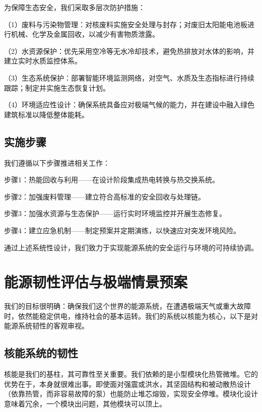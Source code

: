 为保障生态安全，我们采取多层次防护措施：

（1）废料与污染物管理：对核废料实施安全处理与封存；对废旧太阳能电池板进行机械、化学及金属回收，以减少有害物质泄露。

（2）水资源保护：优先采用空冷等无水冷却技术，避免热排放对水体的影响，并建立实时水质监控体系。

（3）生态系统保护：部署智能环境监测网络，对空气、水质及生态指标进行持续跟踪；制定并实施生态恢复计划。

（4）环境适应性设计：确保系统具备应对极端气候的能力，并在建设中融入绿色建筑标准以降低整体能耗。

\subsection{实施步骤}\label{ux5b9eux65bdux6b65ux9aa4}

我们遵循以下步骤推进相关工作：

步骤1：热能回收与利用------在设计阶段集成热电转换与热交换系统。

步骤2：加强废料管理------建立符合高标准的安全回收与处理链。

步骤3：加强水资源与生态保护------运行实时环境监控并开展生态修复。

步骤4：建立应急机制------制定预案并定期演练，以快速应对突发环境风险。

通过上述系统性设计，我们致力于实现能源系统的安全运行与环境的可持续协调。

\section{能源韧性评估与极端情景预案}\label{ux80fdux6e90ux97e7ux6027ux8bc4ux4f30ux4e0eux6781ux7aefux60c5ux666fux9884ux6848}

我们的目标很明确：确保我们这个世界的能源系统，在遭遇极端天气或重大故障时，依然能稳定供电，维持社会的基本运转。我们的系统以核能为核心，以下是对能源系统韧性的客观审视。

\subsection{核能系统的韧性}\label{ux6838ux80fdux7cfbux7edfux7684ux97e7ux6027}

核能是我们的基柱，其可靠性至关重要。我们依赖的是小型模块化热管微堆。它的优势在于，本身就很难出事。即使面对强震或洪水，其坚固结构和被动散热设计（依靠热管，而非容易故障的泵）也能防止堆芯熔毁，实现安全停堆。模块化设计意味着冗余，一个模块出问题，其他模块可以顶上。

